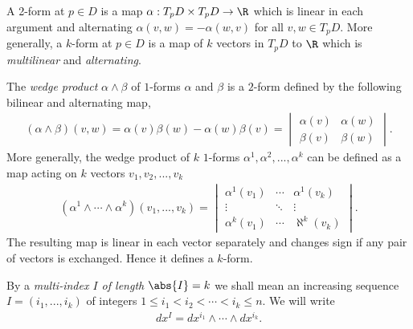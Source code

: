 \documentclass{article}
\begin{document}
\begin{definition}
    A 2-form at $p\in D$ is a map $\alpha:T_pD\times T_p D \to \R$ which is linear in each argument
    and alternating $\alpha(v,w)=-\alpha(w,v)$ for all $v,w\in T_pD$. More generally, a $k$-form at
    $p\in D$ is a map of $k$ vectors in $T_pD$ to $\R$ which is \emph{multilinear} and \emph{alternating}.
\end{definition}

\begin{definition}
    The \emph{wedge product} $\alpha \wedge \beta$ of $1$-forms $\alpha$ and $\beta$ is a $2$-form defined
    by the following bilinear and alternating map,
    \begin{align*}
        (\alpha\wedge\beta)(v,w) = \alpha(v)\beta(w) - \alpha(w)\beta(v) = \begin{vmatrix}
            \alpha(v) &\alpha(w) \\
            \beta(v) &\beta(w)
        \end{vmatrix}.
    \end{align*}
    More generally, the wedge product of $k$ $1$-forms $\alpha^1,\alpha^2,...,\alpha^k$ can be defined as a
    map acting on $k$ vectors $v_1,v_2,...,v_k$
    \begin{align*}
        (\alpha^1\wedge\cdots\wedge\alpha^k)(v_1,...,v_k) = \begin{vmatrix}
            \alpha^1(v_1) &\cdots &\alpha^1(v_k)\\
            \vdots &\ddots &\vdots \\ 
            \alpha^k(v_1) &\cdots &\aleph^k(v_k)
        \end{vmatrix}.
    \end{align*}
    The resulting map is linear in each vector separately and changes sign if any pair of vectors is exchanged.
    Hence it defines a $k$-form.
\end{definition}

\begin{definition}
    By a \emph{multi-index $I$ of length $\abs{I}=k$} we shall mean an increasing sequence
    $I=(i_1,...,i_k)$ of integers $1\leq i_1<i_2<\cdots<i_k\leq n$. We will write
    \begin{align*}
        dx^I = dx^{i_1} \wedge \cdots \wedge dx^{i_k}.
    \end{align*}
\end{definition}
\end{document}
